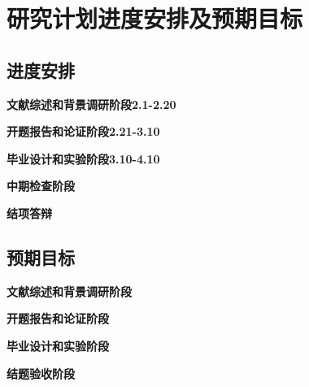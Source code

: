 \section{研究计划进度安排及预期目标}


\subsection{进度安排}

\par \textbf{文献综述和背景调研阶段2.1-2.20}

\par \textbf{开题报告和论证阶段2.21-3.10}

\par \textbf{毕业设计和实验阶段3.10-4.10}

\textbf{中期检查阶段}

\par \textbf{结项答辩}



\subsection{预期目标}

\par \textbf{文献综述和背景调研阶段}

\par \textbf{开题报告和论证阶段}

\par \textbf{毕业设计和实验阶段}

\par \textbf{结题验收阶段}

